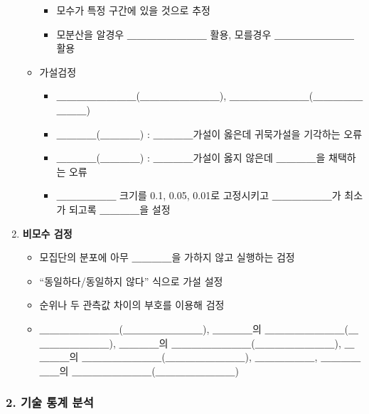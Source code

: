 \documentclass[11pt]{article}
\providecommand{\tightlist}{%
      \setlength{\itemsep}{0pt}\setlength{\parskip}{0pt}}
\begin{document}
\begin{enumerate}
\begin{itemize}
    \begin{itemize}
    \tightlist
    \item
      모수가 특정 구간에 있을 것으로 추정
    \item
      모분산을 알경우 ＿＿＿＿＿＿＿＿ 활용, 모를경우 ＿＿＿＿＿＿＿＿
      활용
    \end{itemize}
  \item
    가설검정

    \begin{itemize}
    \tightlist
    \item
      ＿＿＿＿＿＿＿＿(＿＿＿＿＿＿＿＿),
      ＿＿＿＿＿＿＿＿(＿＿＿＿＿＿＿＿)
    \item
      ＿＿＿＿(＿＿＿＿) : ＿＿＿＿가설이 옳은데 귀묵가설을 기각하는
      오류
    \item
      ＿＿＿＿(＿＿＿＿) : ＿＿＿＿가설이 옳지 않은데 ＿＿＿＿을
      채택하는 오류
    \item
      ＿＿＿＿＿＿ 크기를 0.1, 0.05, 0.01로 고정시키고 ＿＿＿＿＿＿가
      최소가 되고록 ＿＿＿＿을 설정 
    \end{itemize}
  \end{itemize}
\item
  \textbf{비모수 검정}

  \begin{itemize}
  \tightlist
  \item
    모집단의 분포에 아무 ＿＿＿＿을 가하지 않고 실행하는 검정
  \item
    ``동일하다/동일하지 않다'' 식으로 가설 설정
  \item
    순위나 두 관측값 차이의 부호를 이용해 검정
  \item
    ＿＿＿＿＿＿＿＿(＿＿＿＿＿＿＿＿), ＿＿＿＿의
    ＿＿＿＿＿＿＿＿(＿＿＿＿＿＿＿＿), ＿＿＿＿의
    ＿＿＿＿＿＿＿＿(＿＿＿＿＿＿＿＿), ＿＿＿＿의
    ＿＿＿＿＿＿＿＿(＿＿＿＿＿＿＿＿), ＿＿＿＿＿＿, ＿＿＿＿＿＿의
    ＿＿＿＿＿＿＿＿(＿＿＿＿＿＿＿＿)
  \end{itemize}
\end{enumerate}

    \hypertarget{uxae30uxc220-uxd1b5uxacc4-uxbd84uxc11d}{%
\subsubsection{2. 기술 통계
분석}\label{uxae30uxc220-uxd1b5uxacc4-uxbd84uxc11d}}
\end{document}
